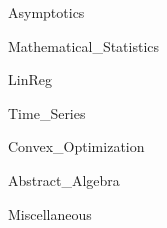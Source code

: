 \documentclass{article}
\numberwithin{equation}{section}
\theoremstyle{definition}
\numberwithin{theorem}{section}
\theoremstyle{definition}
\theoremstyle{definition}
\theoremstyle{definition}
\theoremstyle{definition}
\theoremstyle{definition}
\theoremstyle{definition}
\begin{document}
{Asymptotics}

\pagebreak

{Mathematical_Statistics}

\pagebreak

{LinReg}

\pagebreak

{Time_Series}

\pagebreak

{Convex_Optimization}

\pagebreak

{Abstract_Algebra}

\pagebreak

{Miscellaneous}



\end{document}
